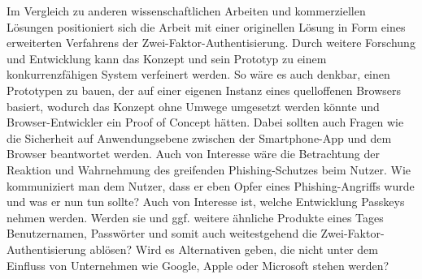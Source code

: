 Im Vergleich zu anderen wissenschaftlichen Arbeiten und kommerziellen Lösungen 
positioniert sich die Arbeit mit einer originellen Lösung in Form eines 
erweiterten Verfahrens der Zwei-Faktor-Authentisierung. Durch weitere Forschung 
und Entwicklung kann das Konzept und sein Prototyp zu einem konkurrenzfähigen 
System verfeinert werden. So wäre es auch denkbar, einen Prototypen zu bauen, 
der auf einer eigenen Instanz eines quelloffenen Browsers basiert, wodurch das 
Konzept ohne Umwege umgesetzt werden könnte und Browser-Entwickler ein Proof of 
Concept hätten. Dabei sollten auch Fragen wie die Sicherheit auf Anwendungsebene 
zwischen der Smartphone-App und dem Browser beantwortet werden. Auch von 
Interesse wäre die Betrachtung der Reaktion und Wahrnehmung des greifenden 
Phishing-Schutzes beim Nutzer. Wie kommuniziert man dem Nutzer, dass er eben 
Opfer eines Phishing-Angriffs wurde und was er nun tun sollte? Auch von 
Interesse ist, welche Entwicklung Passkeys nehmen werden. Werden sie und ggf. 
weitere ähnliche Produkte eines Tages Benutzernamen, Passwörter und somit auch 
weitestgehend die Zwei-Faktor-Authentisierung ablösen? Wird es Alternativen 
geben, die nicht unter dem Einfluss von Unternehmen wie Google, Apple oder 
Microsoft stehen werden?